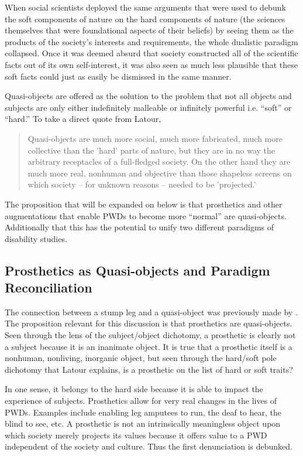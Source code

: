 \documentclass[a4paper]{article}
\begin{document}
When social scientists deployed the same arguments that were used to debunk
the soft components of nature on the hard components of nature (the sciences
themselves that were foundational aspects of their beliefs) by seeing them as
the products of the society's interests and requirements, the whole dualistic
paradigm collapsed. Once it was deemed absurd that society constructed all of
the scientific facts out of its own self-interest, it was also seen as much
less plausible that these soft facts could just as easily be dismissed in the
same manner.

Quasi-objects are offered as the solution to the problem that not all objects
and subjects are only either indefinitely malleable or infinitely powerful
i.e. ``soft'' or ``hard.'' To take a direct quote from Latour,

\begin{quote}
Quasi-objects are much more social, much more fabricated, much more
collective than the 'hard' parts of nature, but they are in no way the
arbitrary receptacles of a full-fledged society. On the other hand they are
much more real, nonhuman and objective than those shapeless screens on which
society – for unknown reasons – needed to be 'projected.' \cite{latour2012we}
\end{quote}

The proposition that will be expanded on below is that prosthetics and other
augmentations that enable PWDs to become more ``normal'' are quasi-objects.
Additionally that this has the potential to unify two different paradigms of
disability studies.


\subsection{Prosthetics as Quasi-objects and Paradigm Reconciliation}

The connection between a stump leg and a quasi-object was previously made by
\cite{bertram2018bestial}. The proposition relevant for this discussion is
that prosthetics are quasi-objects. Seen through the lens of the
subject/object dichotomy, a prosthetic is clearly not a subject because it is
an inanimate object. It is true that a prosthetic itself is a nonhuman,
nonliving, inorganic object, but seen through the hard/soft pole dichotomy
that Latour explains, is a prosthetic on the list of hard or soft traits?

In one sense, it belongs to the hard side because it is able to impact the
experience of subjects. Prosthetics allow for very real changes in the lives
of PWDs. Examples include enabling leg amputees to run, the deaf to hear, the
blind to see, etc. A prosthetic is not an intrinsically meaningless object
upon which society merely projects its values because it offers value to a PWD
independent of the society and culture. Thus the first denunciation is
debunked.
\end{document}
